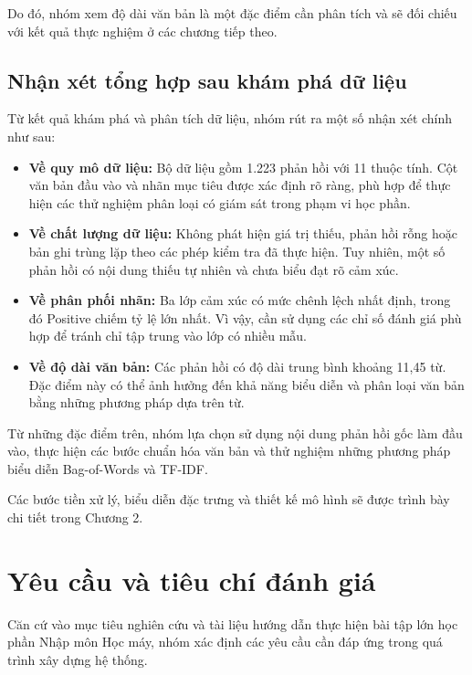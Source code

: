 Do đó, nhóm xem độ dài văn bản là một đặc điểm cần phân tích và sẽ đối chiếu với kết quả thực nghiệm ở các chương tiếp theo.



\subsection{Nhận xét tổng hợp sau khám phá dữ liệu}

Từ kết quả khám phá và phân tích dữ liệu, nhóm rút ra một số nhận xét chính như sau:

\begin{itemize}
    \item \textbf{Về quy mô dữ liệu:} Bộ dữ liệu gồm 1.223 phản hồi với 11 thuộc tính. Cột văn bản đầu vào và nhãn mục tiêu được xác định rõ ràng, phù hợp để thực hiện các thử nghiệm phân loại có giám sát trong phạm vi học phần.

    \item \textbf{Về chất lượng dữ liệu:} Không phát hiện giá trị thiếu, phản hồi rỗng hoặc bản ghi trùng lặp theo các phép kiểm tra đã thực hiện. Tuy nhiên, một số phản hồi có nội dung thiếu tự nhiên và chưa biểu đạt rõ cảm xúc.

    \item \textbf{Về phân phối nhãn:} Ba lớp cảm xúc có mức chênh lệch nhất định, trong đó Positive chiếm tỷ lệ lớn nhất. Vì vậy, cần sử dụng các chỉ số đánh giá phù hợp để tránh chỉ tập trung vào lớp có nhiều mẫu.

    \item \textbf{Về độ dài văn bản:} Các phản hồi có độ dài trung bình khoảng 11,45 từ. Đặc điểm này có thể ảnh hưởng đến khả năng biểu diễn và phân loại văn bản bằng những phương pháp dựa trên từ.
\end{itemize}

Từ những đặc điểm trên, nhóm lựa chọn sử dụng nội dung phản hồi gốc làm đầu vào, thực hiện các bước chuẩn hóa văn bản và thử nghiệm những phương pháp biểu diễn Bag-of-Words và TF-IDF.

Các bước tiền xử lý, biểu diễn đặc trưng và thiết kế mô hình sẽ được trình bày chi tiết trong Chương 2.
\section{Yêu cầu và tiêu chí đánh giá}

Căn cứ vào mục tiêu nghiên cứu và tài liệu hướng dẫn thực hiện bài tập lớn học phần Nhập môn Học máy, nhóm xác định các yêu cầu cần đáp ứng trong quá trình xây dựng hệ thống.

